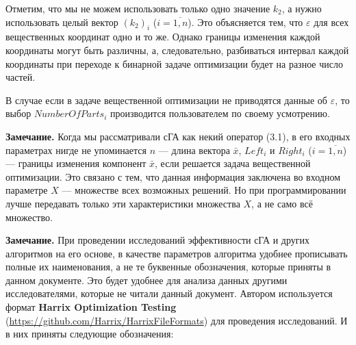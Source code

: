 Отметим, что мы не можем использовать только одно значение  $ k_2 $, а нужно использовать целый вектор $ \left( k_2\right)_i $ ($ i=\overline{1,n} $). Это объясняется тем, что $ \varepsilon $ для всех вещественных координат одно и то же. Однако границы изменения каждой координаты могут быть различны, а, следовательно, разбиваться интервал каждой координаты при переходе к бинарной задаче оптимизации будет на разное число частей.

В случае если в задаче вещественной оптимизации не приводятся данные об $ \varepsilon $, то выбор $ NumberOfParts_i $ производится пользователем по своему усмотрению.

\textbf{Замечание.} Когда мы рассматривали сГА как некий оператор (3.1), в его входных параметрах нигде не упоминается $ n $ --- длина вектора $ \bar{x} $, $ Left_i $ и $ Right_i $ ($ i=\overline{1,n} $) --- границы изменения компонент $ \bar{x} $, если решается задача вещественной оптимизации. Это связано с тем, что данная информация заключена во входном параметре $ X $ --- множестве всех возможных решений. Но при программировании лучше передавать только эти характеристики множества $ X $, а не само всё множество.

\textbf{Замечание.} При проведении исследований эффективности сГА и других алгоритмов на его основе, в качестве параметров алгоритма удобнее прописывать полные их наименования, а не те буквенные обозначения, которые приняты в данном документе. Это будет удобнее для анализа данных другими исследователями, которые не читали данный документ. Автором используется формат \textbf{Harrix Optimization Testing} (\href{https://github.com/Harrix/HarrixFileFormats}{https://github.com/Harrix/HarrixFileFormats}) для проведения исследований. И в них приняты следующие обозначения:

